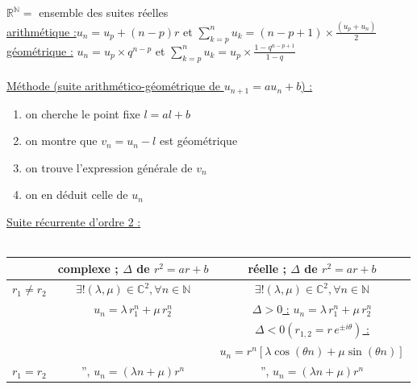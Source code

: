 \documentclass[12 pt]{exampleclass}
\begin{document}
\begin{flushleft}
\begin{doublespace}

	$\mathbb{R}^\mathbb{N} =$ ensemble des suites réelles\\
	\underline{arithmétique :}$u_n=u_p+(n-p)r$ et $\sum\limits_{k=p}^n u_k = (n-p+1)\times \frac{(u_p + u_n)}{2}$ \\
	\underline{géométrique :} $u_n = u_p \times q^{n-p}$ et $\sum\limits_{k = p}^n u_k = u_p \times \frac{1 - q^{n -p + 1}}{1 - q}$\\
	
	\text{ }\\
	\underline{Méthode (suite arithmético-géométrique de $u_{n+1} = au_n + b$) :}\\
	
	\begin{enumerate}
		\item on cherche le point fixe $l = a l+b$
		\item on montre que $v_n = u_n - l$ est géométrique
		\item on trouve l'expression générale de $v_n$
		\item on en déduit celle de $u_n$
	\end{enumerate}
	\underline{Suite récurrente d'ordre 2 :}\\
	\text{}\\
	\begin{tabular}{|c|c|c|}
	\cline{2-3}
	\multicolumn{1}{c|}{}& complexe ; $\Delta$ de $r^2 = a r + b$ & réelle ; $\Delta$ de $r^2 = a r + b$ \\
	\hline
	$r_1 \ne r_2$ & $\exists ! (\lambda , \mu)\in \mathbb{C}^2, \forall n\in \mathbb{N}$ & $\exists ! (\lambda , \mu)\in \mathbb{C}^2, \forall n\in \mathbb{N}$ \\
	& $u_n = \lambda \, r_1^n + \mu \, r_2^n$ &  \underline{$\Delta > 0$ :} $u_n = \lambda \, r_1^n + \mu \, r_2^n$\\
	& & \underline{$\Delta < 0 (r_{1,2} = r\, e^{\pm i \theta})$ :} \\
	& & $u_n =r^n [ \lambda \cos{(\theta n)} + \mu \sin{(\theta n)}]$\\
	\hline
	$r_1 = r_2$ & '', $u_n = (\lambda n + \mu) r^n$ &  '', $u_n = (\lambda n + \mu) r^n$\\
	\hline
	\end{tabular}
	

\end{doublespace}
\end{flushleft}
\end{document}
